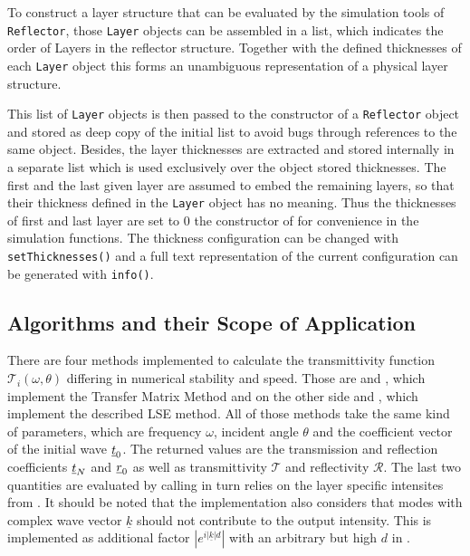 To construct a layer structure that can be evaluated by the simulation tools of
\texttt{Reflector}, those \texttt{Layer} objects can be assembled in a list,
which indicates the order of Layers in the reflector structure. Together with
the defined thicknesses of each \texttt{Layer} object this forms an unambiguous
representation of a physical layer structure.

This list of \texttt{Layer} objects is then passed to the constructor of a
\texttt{Reflector} object and stored as deep copy of the initial list to avoid
bugs through references to the same object. Besides, the layer thicknesses are
extracted and stored internally in a separate list which is used exclusively
over the object stored thicknesses. The first and the last given
layer are assumed to embed the remaining layers, so that their thickness
defined in the \texttt{Layer} object has no meaning. Thus the thicknesses of
first and last layer are set to $0$ the constructor of  for
convenience in the simulation functions. The thickness configuration can be
changed with \texttt{setThicknesses()} and a full text representation of the
current configuration can be generated with \texttt{info()}.

\subsection{Algorithms and their Scope of Application }
There are four methods implemented to calculate the transmittivity function
$\mathcal{T}_i(\omega, \theta)$ differing in numerical stability and speed.
Those are  and , which implement
the Transfer Matrix Method and on the other side  and
, which implement the described LSE method. All of those
methods take the same kind of parameters, which are frequency $\omega$,
incident angle $\theta$ and the coefficient vector of the initial wave
$\underline{t}_0$. The returned values are the transmission and reflection
coefficients $\underline{t}_N$ and $\underline{r}_0$ as well as transmittivity
$\mathcal{T}$ and reflectivity $\mathcal{R}$. The last two quantities
are evaluated by calling  in turn relies on
the layer specific intensites from . It should be noted
that the implementation also considers that modes with complex wave vector
$\underline{k}$
should not contribute to the output intensity. This is implemented as
additional factor $|e^{i|\underline{k}|d}|$ with an arbitrary but high $d$ in
.

